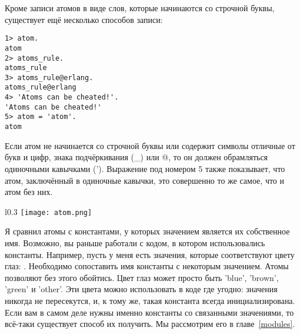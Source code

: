 Кроме записи атомов в виде слов, которые начинаются со строчной буквы, существует ещё несколько способов записи:
\begin{lstlisting}[style=repl]
1> atom.
atom
2> atoms_rule.
atoms_rule
3> atoms_rule@erlang.
atoms_rule@erlang
4> 'Atoms can be cheated!'.
'Atoms can be cheated!'
5> atom = 'atom'.
atom
\end{lstlisting}

Если атом не начинается со строчной буквы или содержит символы отличные от букв и цифр, знака подчёркивания (\_) или @, то он должен обрамляться одиночными кавычками ('). Выражение под номером 5 также показывает, что атом, заключённый в одиночные кавычки, это совершенно то же самое, что и атом без них.

\begin{wrapfigure}{l}{0.3\linewidth}
    \texttt{[image: atom.png]}
\end{wrapfigure}
Я сравнил атомы с константами, у которых значением является их собственное имя. Возможно, вы раньше работали с кодом, в котором использовались константы. Например, пусть у меня есть значения, которые соответствуют цвету глаз:  . Необходимо сопоставить имя константы с некоторым значением. Атомы позволяют без этого обойтись. Цвет глаз может просто быть 'blue', 'brown', 'green' и 'other'. Эти цвета можно использовать в коде где угодно: значения никогда не пересекутся, и, к тому же, такая константа всегда инициализирована. Если вам в самом деле нужны именно константы со связанными значениями, то всё\--таки существует способ их получить. Мы рассмотрим его в главе~\ref{modules}.

